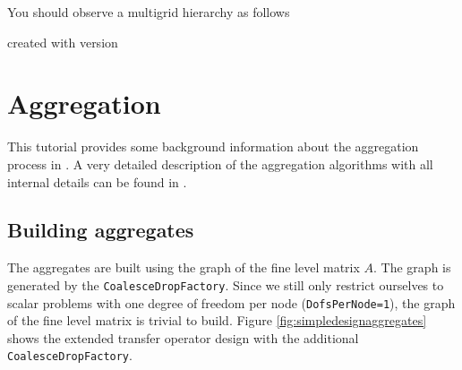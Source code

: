 \documentclass[10pt,fleqn]{book}
\newcommand\printScreenOutput[1]{

{\vspace{-0.3cm}\hfill\tiny{created with \muelu version }}
}
\begin{document}
You should observe a multigrid hierarchy as follows

\printScreenOutput{s5a.txt_3.fragment_3.fragment}

\chapter{Aggregation}

This tutorial provides some background information about the aggregation process in \muelu. A very detailed description of the aggregation algorithms with all internal details can be found in \cite[Chapter 3.3]{wiesner2014}.

\section{Building aggregates}

The aggregates are built using the graph of the fine level matrix $A$. The graph is generated by the \verb|CoalesceDropFactory|. Since we still only restrict ourselves to scalar problems with one degree of freedom per node (\texttt{DofsPerNode=1}), the graph of the fine level matrix is trivial to build.
Figure \ref{fig:simpledesignaggregates} shows the extended transfer operator design with the additional \verb|CoalesceDropFactory|.
\end{document}
